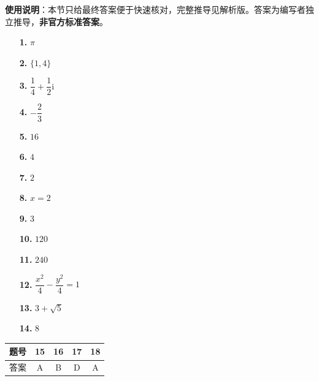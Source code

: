 
\begin{gknotice}
\textbf{使用说明}：本节只给最终答案便于快速核对，完整推导见解析版。答案为编写者独立推导，\textbf{非官方标准答案}。
\end{gknotice}

\begin{itemize}[leftmargin=2.6em]
  \item[\textbf{1.}] \(\pi\)
  \item[\textbf{2.}] \(\{1,4\}\)
  \item[\textbf{3.}] \(\dfrac{1}{4}+\dfrac{1}{2}\mathrm{i}\)
  \item[\textbf{4.}] \(-\dfrac{2}{3}\)
  \item[\textbf{5.}] \(16\)
  \item[\textbf{6.}] \(4\)
  \item[\textbf{7.}] \(2\)
  \item[\textbf{8.}] \(x=2\)
  \item[\textbf{9.}] \(3\)
  \item[\textbf{10.}] \(120\)
  \item[\textbf{11.}] \(240\)
  \item[\textbf{12.}] \(\dfrac{x^{2}}{4}-\dfrac{y^{2}}{4}=1\)
  \item[\textbf{13.}] \(3+\sqrt{5}\)
  \item[\textbf{14.}] \(8\)
\end{itemize}

\begin{center}\begin{tabular}{ccccc}
\toprule
题号 & 15 & 16 & 17 & 18 \\
\midrule
答案 & A & B & D & A \\
\bottomrule
\end{tabular}\end{center}

